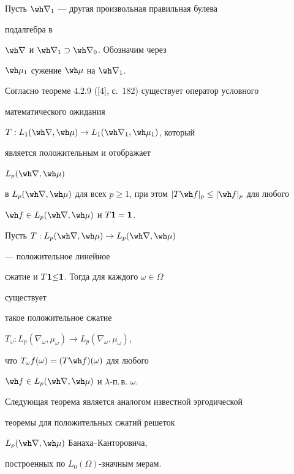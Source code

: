  


Пусть $\wh\nabla_1$ --- другая произвольная правильная булева 


подалгебра в 


$\wh\nabla$ и $\wh\nabla_1\supset\wh\nabla_0$. Обозначим через 


$\wh\mu_1$ сужение $\wh\mu$ на $\wh\nabla_1$. 


Согласно теореме 4.2.9 ([4], с.\, 182) существует оператор условного 


математического ожидания 


$T:L_1(\wh\nabla,\wh\mu)\to L_1(\wh\nabla_1,\wh\mu_1)$, который 


является положительным и отображает 


$L_p(\wh\nabla,\wh\mu)$ 


в $L_p(\wh\nabla,\wh\mu)$ для всех $p\ge1$, при этом $|T\wh f|_p\le|\wh 


f|_p$ для любого 


$\wh f\in L_p(\wh\nabla,\wh\mu)$ и $T\bold 1=\bold 1$. 


 


\begin{thm} 


Пусть $T:L_p(\wh\nabla,\wh\mu)\to L_p(\wh\nabla,\wh\mu)$ 


--- положительное линейное 


сжатие и $T\bold 1{\le}\bold 1$. Тогда для каждого $\omega\in\Omega$ 


существует 


такое положительное сжатие 


$T_\omega:L_p(\nabla_\omega,\mu_\omega)\to 


L_p(\nabla_\omega,\mu_\omega)$, 


что $T_\omega f(\omega)=(T\wh f)(\omega)$ для любого 


$\wh f\in L_p(\wh\nabla,\wh\mu)$ и $\lambda$-п.\,в. $\omega$. 


\end{thm} 


 


Следующая теорема является аналогом известной эргодической 


теоремы для положительных сжатий решеток 


$L_p(\wh\nabla,\wh\mu)$ Банаха--Канторовича, 


построенных по $L_0(\Omega)$-значным мерам. 


